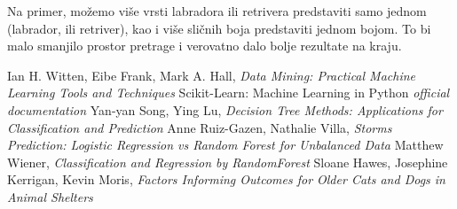 \documentclass[11pt]{article}
\begin{document}
Na primer, možemo više vrsti labradora ili retrivera predstaviti samo
jednom (labrador, ili retriver), kao i više sličnih boja predstaviti
jednom bojom. To bi malo smanjilo prostor pretrage i verovatno dalo
bolje rezultate na kraju.

    \begin{thebibliography}{10}
        Ian H. Witten, Eibe Frank, Mark A. Hall, \emph{Data Mining: Practical Machine Learning Tools and Techniques}
        Scikit-Learn: Machine Learning in Python \emph{official documentation}
        Yan-yan Song, Ying Lu, \emph{Decision Tree Methods: Applications for Classification and Prediction}
        Anne Ruiz-Gazen, Nathalie Villa, \emph{Storms Prediction: Logistic Regression vs Random Forest for Unbalanced Data}
        Matthew Wiener, \emph{Classification and Regression by RandomForest}
        Sloane Hawes, Josephine Kerrigan, Kevin Moris, \emph{Factors Informing Outcomes for Older Cats and Dogs in Animal Shelters}
        \end{thebibliography}
        

    
\end{document}
